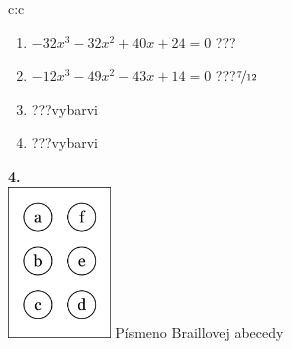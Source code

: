 \documentclass[10pt]{report}
\begin{document}
\begin{tabular}{c:c}
\begin{minipage}[c][99mm][t]{0.49\linewidth}
\begin{center}
\begin{minipage}{0.77\linewidth}
\begin{center}
\begin{varwidth}{\textwidth}
\begin{enumerate}
\item $-32x^3-32x^2+40x+24=0$\quad \dotfill\; ???\;\dotfill {}
\item $-12x^3-49x^2-43x+14=0$\quad \dotfill\; ???\;\dotfill \quad $\nicefrac{7}{12}$
\item \quad \dotfill\; ???\;\dotfill \quad vybarvi
\item \quad \dotfill\; ???\;\dotfill \quad vybarvi
\end{enumerate}
\end{varwidth}
\end{center}
\end{minipage}
\begin{minipage}{0.20\linewidth}
\begin{center}
{\Huge\bfseries 4.} \\[2mm]
\includegraphics[height=40mm]{../images/braille.png}
{\small Písmeno Braillovej abecedy}
\end{center}
\end{minipage}
\end{center}
\end{minipage}

\end{tabular}
\clearpage
\thispagestyle{empty}
\end{document}

